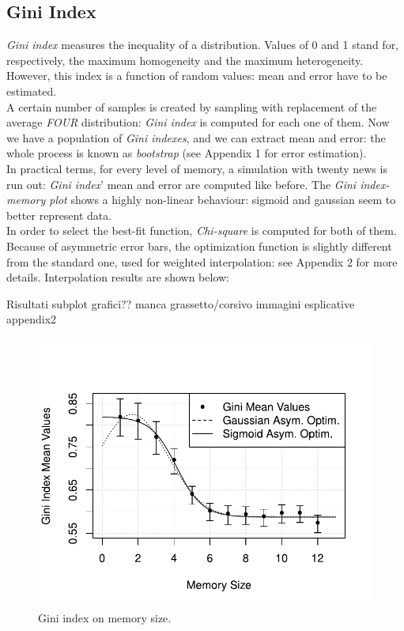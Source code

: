 \subsection{Gini Index}
\textit{Gini index} \cite{ginindex} measures the inequality of a distribution. Values of 0 and 1 stand for, respectively, the maximum homogeneity and the maximum heterogeneity.
However, this index is a function of random values: mean and error have to be estimated.\\
A certain number of samples is created by sampling with replacement of the average \textit{FOUR} distribution: \textit{Gini index} is computed for each one of them.
Now we have a population of \textit{Gini indexes}, and we can extract mean and error: the whole process is known as \textit{bootstrap} \cite{bootstrap} (see Appendix 1 for error estimation).\\
In practical terms, for every level of  memory, a simulation with twenty news is run out: \textit{Gini index}' mean and error are computed like before.
The \textit{Gini index-memory plot} shows a highly non-linear behaviour: sigmoid and gaussian seem to better represent data.\\
 In order to select the best-fit function, \textit{Chi-square} is computed for both of them. \\
Because of asymmetric error bars, the optimization function is slightly different from the standard one, used for weighted interpolation: see Appendix 2 for more details.
Interpolation results are shown below:


Risultati
subplot grafici??
manca grassetto/corsivo
immagini esplicative appendix2
\begin{figure}[h]
  \centering
  \includegraphics[trim={0cm 0cm 0cm 1cm},clip,width=.8\columnwidth]{img/gini.pdf}
  \caption{Gini index on memory size.}
  \label{fig:gini}
\end{figure}

